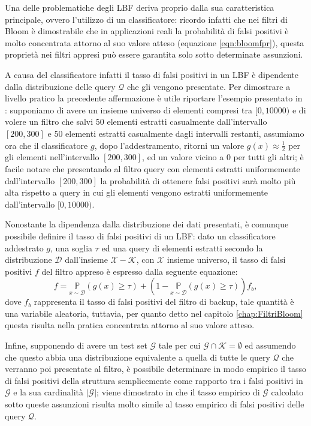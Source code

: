 \documentclass[../../main.tex]{subfiles}
\begin{document}
    
    Una delle problematiche degli LBF deriva proprio dalla sua caratteristica principale, ovvero l'utilizzo di un classificatore: ricordo infatti che nei filtri di Bloom è dimostrabile che in applicazioni reali la probabilità di falsi positivi è molto concentrata attorno al suo valore atteso (equazione \ref{eqn:bloomfpr}), questa proprietà nei filtri appresi può essere garantita solo sotto determinate assunzioni.

    A causa del classificatore infatti il tasso di falsi positivi in un LBF è dipendente dalla distribuzione delle query $\mathcal{Q}$ che gli vengono presentate. Per dimostrare a livello pratico la precedente affermazione è utile riportare l'esempio presentato in \cite{10.5555/3326943.3326986}: supponiamo di avere un insieme universo di elementi compresi tra $[0, 10000)$ e di volere un filtro che salvi 50 elementi estratti casualmente dall'intervallo $[200,300]$ e 50 elementi estratti casualmente dagli intervalli restanti, assumiamo ora che il classificatore $g$, dopo l'addestramento, ritorni un valore $g(x) \approx \frac{1}{2}$ per gli elementi nell'intervallo $[200,300]$, ed un valore vicino a 0 per tutti gli altri; è facile notare che presentando al filtro query con elementi estratti uniformemente dall'intervallo $[200,300]$ la probabilità di ottenere falsi positivi sarà molto più alta rispetto a query in cui gli elementi vengono estratti uniformemente dall'intervallo $[0, 10000)$.

    Nonostante la dipendenza dalla distribuzione dei dati presentati, è comunque possibile definire il tasso di falsi positivi di un LBF: dato un classificatore addestrato $g$, una soglia $\tau$ ed una query di elementi estratti secondo la distribuzione $\mathcal{D}$ dall'insieme $\mathcal{X} - \mathcal{K}$, con $\mathcal{X}$ insieme universo, il tasso di falsi positivi $f$ del filtro appreso è espresso dalla seguente equazione:
    \begin{equation}
        f = \underset{x \sim \mathcal{D}}{\mathbb{P}}(g(x) \geq \tau) + (1 - \underset{x \sim \mathcal{D}}{\mathbb{P}}(g(x) \geq \tau))f_b,
        \label{eqn:LBFFalsiPositivi}
    \end{equation} 
    dove $f_b$ rappresenta il tasso di falsi positivi del filtro di backup, tale quantità è una variabile aleatoria, tuttavia, per quanto detto nel capitolo \ref{chap:FiltriBloom} questa risulta nella pratica concentrata attorno al suo valore atteso.

    Infine, supponendo di avere un test set $\mathcal{G}$ tale per cui $\mathcal{G} \cap \mathcal{K} = \emptyset$ ed assumendo che questo abbia una distribuzione equivalente a quella di tutte le query $\mathcal{Q}$ che verranno poi presentate al filtro, è possibile determinare in modo empirico il tasso di falsi positivi della struttura semplicemente come rapporto tra i falsi positivi in $\mathcal{G}$ e la sua cardinalità $|\mathcal{G}|$; viene dimostrato in \cite{10.5555/3326943.3326986} che il tasso empirico di $\mathcal{G}$ calcolato sotto queste assunzioni risulta molto simile al tasso empirico di falsi positivi delle query $\mathcal{Q}$.
\end{document}
